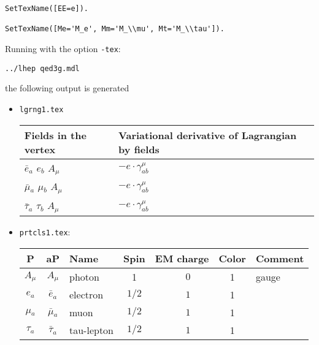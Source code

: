 \begin{frame}{}
\begin{lstlisting}
SetTexName([EE=e]).

SetTexName([Me='M_e', Mm='M_\\mu', Mt='M_\\tau']).
\end{lstlisting}

Running with the option \lstinline{-tex}:
\begin{lstlisting}
../lhep qed3g.mdl
\end{lstlisting}
the following output is generated
\begin{itemize}
\item \lstinline{lgrng1.tex}
\begin{center}

\begin{tabular}{|l|l|} \hline
Fields in the vertex & Variational derivative of Lagrangian by fields \\ \hline
$\bar{e}{}_{a }$ \phantom{-} $e{}_{b }$ \phantom{-} ${A}_{\mu }$ \phantom{-}  &
        $- e\cdot \gamma_{a b}^\mu $\\[2mm]
$\bar{\mu}{}_{a }$ \phantom{-} $\mu{}_{b }$ \phantom{-} ${A}_{\mu }$ \phantom{-}  &
        $- e\cdot \gamma_{a b}^\mu $\\[2mm]
$\bar{\tau}{}_{a }$ \phantom{-} $\tau{}_{b }$ \phantom{-} ${A}_{\mu }$ \phantom{-}  &
        $- e\cdot \gamma_{a b}^\mu $\\ \hline
\end{tabular}

\end{center}



\item \lstinline{prtcls1.tex}:
  \begin{center}
    \begin{tabular}{|cc|l|c|c|c|l|} \hline
P & aP & Name & Spin  & EM charge & Color & Comment \\ \hline
$A_{\mu }$&$A_{\mu }$&photon        &1           & $\phantom{-}0$ &1    &gauge\\
$e{}_{a}$ &$\bar{e}{}_{a}$&electron      &$1/2$       &$\phantom{-}1$ &1    &   \\
$\mu{}_{a}$&$\bar{\mu}{}_{a}$&muon          &$1/2$       &$\phantom{-}1$ &1    &   \\
$\tau{}_{a}$&$\bar{\tau}{}_{a}$&tau-lepton    &$1/2$       &$\phantom{-}1$ &1    &   \\ \hline
\end{tabular}
  \end{center}


\end{itemize}
\end{frame}
